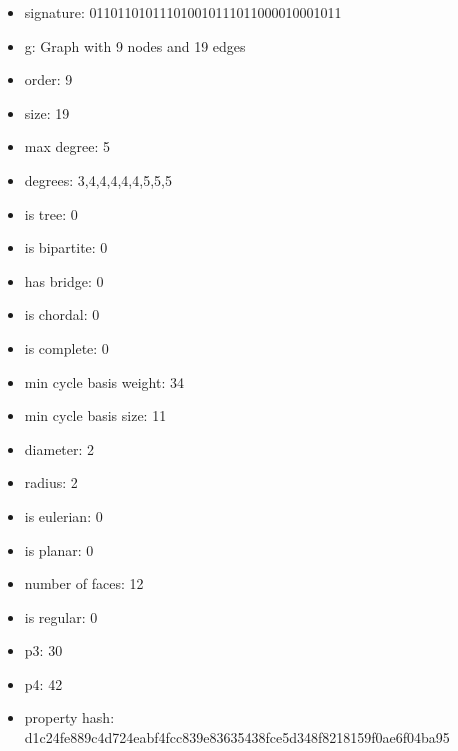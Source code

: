 \newpage
\begin{figure}
\end{figure}
\begin{itemize}
\item signature: 011011010111010010111011000010001011
\item g: Graph with 9 nodes and 19 edges
\item order: 9
\item size: 19
\item max degree: 5
\item degrees: 3,4,4,4,4,4,5,5,5
\item is tree: 0
\item is bipartite: 0
\item has bridge: 0
\item is chordal: 0
\item is complete: 0
\item min cycle basis weight: 34
\item min cycle basis size: 11
\item diameter: 2
\item radius: 2
\item is eulerian: 0
\item is planar: 0
\item number of faces: 12
\item is regular: 0
\item p3: 30
\item p4: 42
\item property hash: d1c24fe889c4d724eabf4fcc839e83635438fce5d348f8218159f0ae6f04ba95
\end{itemize}
